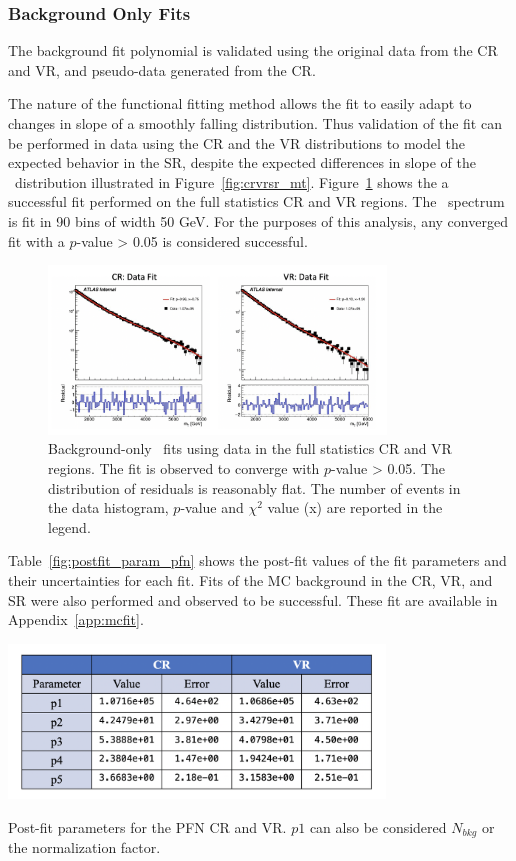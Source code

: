 \subsubsection{Background Only Fits}
\label{subsec:fit_bkgonly}

The background fit polynomial is validated using the original data from the CR and VR, and pseudo-data generated from the CR.

The nature of the functional fitting method allows the fit to easily adapt to changes in slope of a smoothly falling distribution.
Thus validation of the fit can be performed in data using the CR and the VR distributions to model the expected behavior in the SR, despite the expected differences in slope of the \mt~distribution illustrated in Figure~\ref{fig:crvrsr_mt}.
Figure~\ref{fig:bkgfit_data_fullstats} shows the a successful fit performed on the full statistics CR and VR regions.
The \mt~spectrum is fit in 90 bins of width 50 GeV. 
For the purposes of this analysis, any converged fit with a $p$-value > 0.05 is considered successful. 

\begin{figure}[!htbp]
\centering
   \includegraphics[width=0.8\textwidth]{figures/stats/bkgfit_data_fullstats}
    \caption{Background-only \mt~fits using data in the full statistics CR and VR regions. The fit is observed to converge with $p$-value > 0.05. The distribution of residuals is reasonably flat. The number of events in the data histogram, $p$-value and $\chi^2$ value (x) are reported in the legend. 
    \label{fig:bkgfit_data_fullstats}}
\end{figure}

Table~\ref{fig:postfit_param_pfn} shows the post-fit values of the fit parameters and their uncertainties for each fit. Fits of the MC background in the CR, VR, and SR were also performed and observed to be successful. These fit are available in Appendix~\ref{app:mcfit}. 
\begin{table}[!htbp]
\centering
   \includegraphics[width=0.75\textwidth]{figures/stats/postfit_param_pfn}
    \caption{Post-fit parameters for the PFN CR and VR. $p1$ can also be considered $N_{bkg}$ or the normalization factor.
    \label{fig:postfit_param_pfn}}
\end{table}


